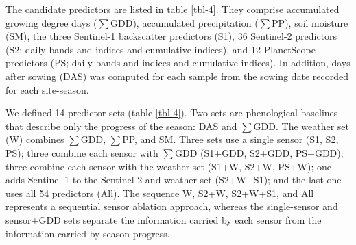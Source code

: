 \documentclass[
  british,
]{interact}
\begin{document}
The candidate predictors are listed in table \ref{tbl-4}. They comprise
accumulated growing degree days (\(\sum\)GDD), accumulated precipitation
(\(\sum\)PP), soil moisture (SM), the three Sentinel-1 backscatter
predictors (S1), 36 Sentinel-2 predictors (S2; daily bands and indices
and cumulative indices), and 12 PlanetScope predictors (PS; daily bands
and indices and cumulative indices). In addition, days after sowing
(DAS) was computed for each sample from the sowing date recorded for
each site-season.

We defined 14 predictor sets (table \ref{tbl-4}). Two sets are
phenological baselines that describe only the progress of the season:
DAS and \(\sum\)GDD. The weather set (W) combines \(\sum\)GDD,
\(\sum\)PP, and SM. Three sets use a single sensor (S1, S2, PS); three
combine each sensor with \(\sum\)GDD (S1+GDD, S2+GDD, PS+GDD); three
combine each sensor with the weather set (S1+W, S2+W, PS+W); one adds
Sentinel-1 to the Sentinel-2 and weather set (S2+W+S1); and the last one
uses all 54 predictors (All). The sequence W, S2+W, S2+W+S1, and All
represents a sequential sensor ablation approach, whereas the
single-sensor and sensor+GDD sets separate the information carried by
each sensor from the information carried by season progress.
\end{document}

